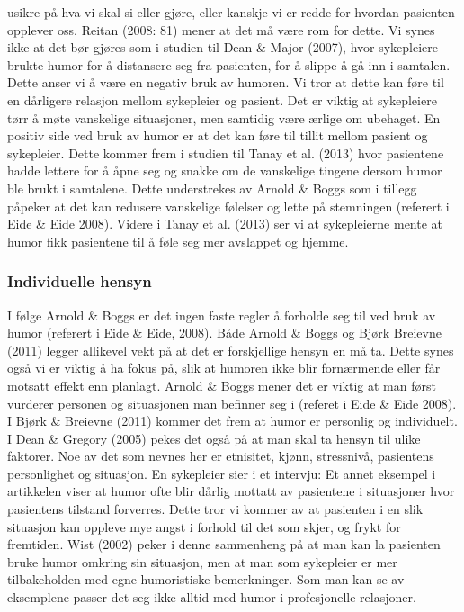 usikre på hva vi skal si eller gjøre, eller kanskje vi er redde for hvordan
pasienten opplever oss. Reitan (2008: 81) mener at det må være rom for dette.
Vi synes ikke at det bør gjøres som i studien til Dean \&{} Major (2007), hvor
sykepleiere brukte humor for å distansere seg fra pasienten, for å slippe å gå
inn i samtalen. Dette anser vi å være en negativ bruk av humoren. Vi tror at
dette kan føre til en dårligere relasjon mellom sykepleier og pasient. Det er
viktig at sykepleiere tørr å møte vanskelige situasjoner, men samtidig være
ærlige om ubehaget.  En positiv side ved bruk av humor er at det kan føre til
tillit mellom pasient og sykepleier. Dette kommer frem i studien til Tanay et
al. (2013) hvor pasientene hadde lettere for å åpne seg og snakke om de
vanskelige tingene dersom humor ble brukt i samtalene. Dette understrekes av
Arnold \&{} Boggs som i tillegg påpeker at det kan redusere vanskelige følelser og
lette på stemningen (referert i Eide \&{} Eide 2008). Videre i Tanay et al. (2013)
ser vi at sykepleierne mente at humor fikk pasientene til å føle seg mer
avslappet og hjemme.

\subsubsection{Individuelle hensyn}

I følge Arnold \&{} Boggs er det ingen faste regler å forholde seg til ved bruk av
humor (referert i Eide \&{} Eide, 2008). Både Arnold \&{} Boggs og Bjørk Breievne
(2011) legger allikevel vekt på at det er forskjellige hensyn en må ta. Dette
synes også vi er viktig å ha fokus på, slik at humoren ikke blir fornærmende
eller får motsatt effekt enn planlagt. Arnold \&{} Boggs mener det er viktig at
man først vurderer personen og situasjonen man befinner seg i (referet i Eide \&
Eide 2008). I Bjørk \&{} Breievne (2011) kommer det frem at humor er personlig og
individuelt. I Dean \&{} Gregory (2005) pekes det også på at man skal ta hensyn
til ulike faktorer. Noe av det som nevnes her er etnisitet, kjønn, stressnivå,
pasientens personlighet og situasjon. En sykepleier sier i et intervju:
 Et annet
eksempel i artikkelen viser at humor ofte blir dårlig mottatt av pasientene i
situasjoner hvor pasientens tilstand forverres. Dette tror vi kommer av at
pasienten i en slik situasjon kan oppleve mye angst i forhold til det som
skjer, og frykt for fremtiden. Wist (2002) peker i denne sammenheng på at man
kan la pasienten bruke humor omkring sin situasjon, men at man som sykepleier
er mer tilbakeholden med egne humoristiske bemerkninger. Som man kan se av
eksemplene passer det seg ikke alltid med humor i profesjonelle relasjoner.

